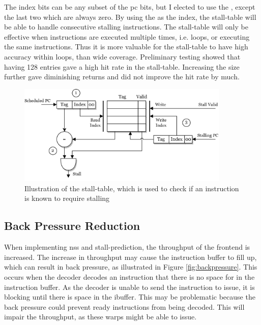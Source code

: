 The index bits can be any subset of the \acrshort{pc} bits, but I elected to use the , except the last two which are always zero. By using the  as the index, the stall-table will be able to handle consecutive stalling instructions. The stall-table will only be effective when instructions are executed multiple times, i.e. loops, or  executing the same instructions. Thus it is more valuable for the stall-table to have high accuracy within loops, than wide coverage. Preliminary testing showed that having 128 entries gave a high hit rate in the stall-table. Increasing the size further gave diminishing returns and did not improve the hit rate by much. 

\begin{figure}
    \centering
    \includegraphics[width=0.9\textwidth]{figures/stall_table.png}
    \caption[Illustration of the stall table.]{Illustration of the stall-table, which is used to check if an instruction is known to require stalling}
    \label{fig:stall_table}
\end{figure}



\subsection{Back Pressure Reduction}

When implementing \acrshort{nss} and stall-prediction, the throughput of the frontend is increased. The increase in throughput may cause the instruction buffer to fill up, which can result in back pressure, as illustrated in Figure \ref{fig:backpressure}. This occurs when the decoder decodes an instruction that there is no space for in the instruction buffer. As the decoder is unable to send the instruction to issue, it is blocking until there is space in the ibuffer. This may be problematic because the back pressure could prevent ready instructions from being decoded. This will impair the throughput, as these warps might be able to issue.

